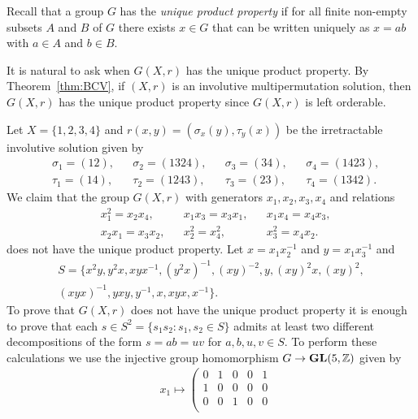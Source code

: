 Recall that a group $G$ has the \emph{unique product property} if 
for all finite non-empty subsets $A$ and $B$ of $G$ there exists $x\in G$ 
that can be written uniquely as $x = ab$ with $a\in A$ and $b\in B$. 

It is natural to ask when $G(X,r)$ has the unique product property. By Theorem~\ref{thm:BCV}, if $(X,r)$ is an involutive
multipermutation solution, then $G(X,r)$ has the unique product property since $G(X,r)$ is left orderable. 

\begin{example}
    \label{pro:4-19}
	Let $X=\{1,2,3,4\}$ and $r(x,y)=(\sigma_x(y),\tau_y(x))$ be the irretractable involutive solution given by 
	\begin{align*}
		&\sigma_1=(12), && \sigma_2=(1324), && \sigma_3=(34), && \sigma_4=(1423),\\
		&\tau_1=(14), &&\tau_2=(1243), && \tau_3=(23), && \tau_4=(1342).
	\end{align*}
	We claim that the group $G(X,r)$ with 
	generators
	$x_1,x_2,x_3,x_4$ and relations
	\begin{align*}
		& x_1^2=x_2x_4,
		&& x_1x_3=x_3x_1,
		&& x_1x_4=x_4x_3,\\
		& x_2x_1=x_3x_2,
		&& x_2^2=x_4^2,
		&& x_3^2=x_4x_2.
	\end{align*}
	does not have the unique product property. Let $x=x_1x_2^{-1}$ and $y=x_1x_3^{-1}$ and 
    \begin{multline}
    \label{eq:Promislow}
    S=\{ x^2y,
    y^2x,
    xyx^{-1},
    (y^2x)^{-1},
    (xy)^{-2},
    y,
    (xy)^2x,
    (xy)^2,\\
    (xyx)^{-1},
    yxy,
    y^{-1},
    x,
    xyx, 
    x^{-1}
	\}.
    \end{multline}
    To prove that $G(X,r)$ does not have
    the unique product property it is enough to prove that 
    each $s\in S^2=\{s_1s_2:s_1,s_2\in S\}$ admits at least two different decompositions 
    of the form $s=ab=uv$ for $a,b,u,v\in S$. To perform these calculations we 
    use the injective group homomorphism $G\to\mathbf{GL}(5,\mathbb{Z})$ given by  
	\begin{align*}
	&x_1\mapsto\left(\begin{smallmatrix}
	0 & 1 & 0 & 0 & 1\\
	1 & 0 & 0 & 0 & 0\\
	0 & 0 & 1 & 0 & 0\\

\end{smallmatrix}
\end{align*}
\end{example}
